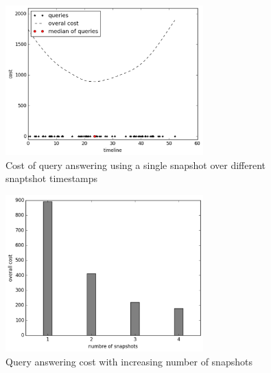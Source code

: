 \begin{figure}[tb]
    \includegraphics[width=3in]{figs/single.pdf}
    \caption{Cost of query answering using a single snapshot over different
    snaptshot timestamps}
\end{figure}

\begin{figure}[tb]
    \includegraphics[width=3in]{figs/snap_cost.pdf}
    \caption{Query answering cost with increasing number of snapshots}
\end{figure}
